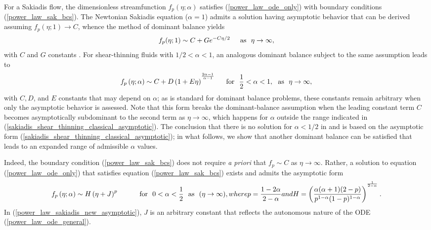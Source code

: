 \documentclass[lineno]{JFM-FLM_Au}
\begin{document}
For a Sakiadis flow, the dimensionless streamfunction $f_p(\eta; \alpha)$ satisfies (\ref{power_law_ode_only}) with boundary conditions (\ref{power_law_sak_bcs}). The Newtonian Sakiadis equation ($\alpha=1$) admits a solution having asymptotic behavior that can be derived assuming $f_p(\eta; 1) \to C$, whence the method of dominant balance yields\begin{equation} f_p(\eta; 1) \sim C + Ge^{-C\eta/2} \hphantom{\sum} \text{as}~~ \eta \to \infty,\end{equation} with $C$ and $G$ constants \citep{GenMeth}. For shear-thinning fluids with $1/2 < \alpha < 1$, an analogous dominant balance subject to the same assumption leads to \begin{equation}
    f_p\left(\eta; \alpha\right) \sim C + D\left(1 + E\eta \right)^{^{\frac{2\alpha-1}{\alpha-1}}} \hphantom{\sum} \mathrm{for}~~ \frac{1}{2}<\alpha<1, ~~ \mathrm{as}~~\eta \to \infty, \label{sakiadis_shear_thinning_classical_asymptotic}
\end{equation} with $C, D$, and $E$ constants that may depend on $\alpha$; as is standard for dominant balance problems, these constants remain arbitrary when only the asymptotic behavior is assessed. Note that this form breaks the dominant-balance assumption when the leading constant term $C$ becomes asymptotically subdominant to the second term as $\eta \to \infty$, which happens for $\alpha$ outside the range indicated in (\ref{sakiadis_shear_thinning_classical_asymptotic}). The conclusion that there is no solution for $\alpha<1/2$ in \citet{Fox} and \citet{NonNewtonian} is based on the asymptotic form (\ref{sakiadis_shear_thinning_classical_asymptotic}); in what follows, we show that another dominant balance can be satisfied that leads to an expanded range of admissible $\alpha$ values.

Indeed, the boundary condition (\ref{power_law_sak_bcs}) does not require \textit{a priori} that $f_p \sim C$ as $\eta \to \infty$. Rather, a solution to equation (\ref{power_law_ode_only}) that satisfies equation (\ref{power_law_sak_bcs}) exists and admits the asymptotic form \begin{subequations} \begin{equation}
    f_p\left(\eta; \alpha \right) \sim H \left(\eta+J\right)^{p} \hphantom{\sum\sum} \mathrm{for}~~0 < \alpha < \dfrac{1}{2}~~ \mathrm{as}~~ (\eta \to \infty),
\end{equation} where \begin{equation} p = \dfrac{1-2\alpha}{2-\alpha} \end{equation}  and \begin{equation}
    H = \left(\dfrac{\alpha(\alpha+1)(2-p)}{p^{1-\alpha}(1-p)^{1-\alpha}}\right)^{^{\frac{1}{2-\alpha}}}.
\end{equation} \label{power_law_sakiadis_new_asymptotic} \end{subequations} \noindent In (\ref{power_law_sakiadis_new_asymptotic}), $J$ is an arbitrary constant that reflects the autonomous nature of the ODE (\ref{power_law_ode_general}).
\end{document}
